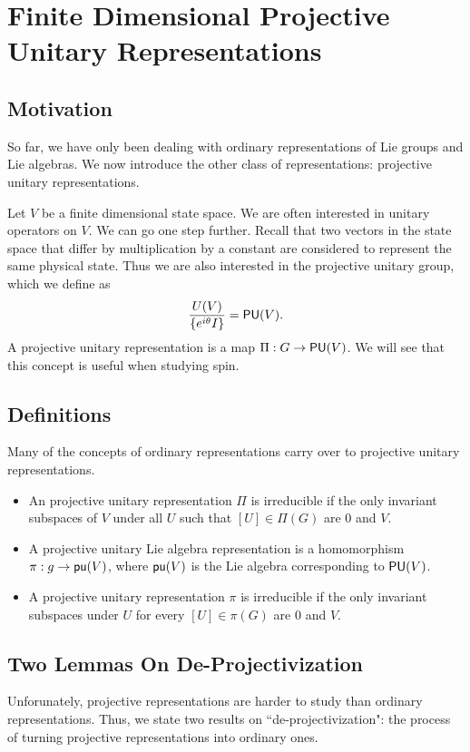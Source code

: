 \section{Finite Dimensional Projective Unitary Representations}
\subsection{Motivation}
So far, we have only been dealing with ordinary representations of Lie groups and Lie algebras. We now introduce the other class of representations: projective unitary representations.

Let $V$ be a finite dimensional state space. We are often interested in unitary operators on $V$. We can go one step further. Recall that two vectors in the state space that differ by multiplication by a constant are considered to represent the same physical state. Thus we are also interested in the projective unitary group, which we define as
\[
    \frac{U(V)}{\{e^{i\theta}I\}} = \operatorname{\textsf{PU}}(V).
\]
A projective unitary representation is a map $\Pi: G \rightarrow \operatorname{\textsf{PU}}(V)$. We will see that this concept is useful when studying spin.

\subsection{Definitions}
Many of the concepts of ordinary representations carry over to projective unitary representations.
\begin{itemize}
    \item An projective unitary representation $\Pi$ is irreducible if the only invariant subspaces of $V$ under all $U$ such that $[U] \in \Pi(G)$ are $0$ and $V$.
    \item A projective unitary Lie algebra representation is a homomorphism $\mathfrak\pi: g \rightarrow \operatorname{\textsf{pu}}(V)$, where $\operatorname{\textsf{pu}}(V)$ is the Lie algebra corresponding to $\operatorname{\textsf{PU}}(V)$.
    \item A projective unitary representation $\pi$ is irreducible if the only invariant subspaces under $U$ for every $[U] \in \pi(G)$ are $0$ and $V$.
\end{itemize}

\subsection{Two Lemmas On De-Projectivization}
Unforunately, projective representations are harder to study than ordinary representations. Thus, we state two results on ``de-projectivization": the process of turning projective representations into ordinary ones.

